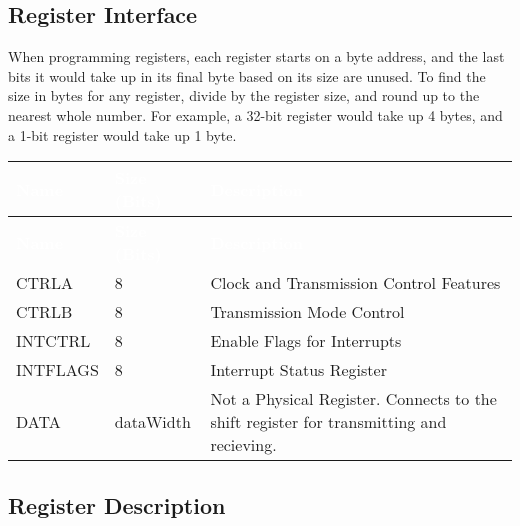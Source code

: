 \subsection{Register Interface}
 
When programming registers, each register starts on a byte address, and the last bits it would take up in its final byte based on its size are unused. To find the size in bytes for any register, divide by the register size, and round up to the nearest whole number. For example, a 32-bit register would take up 4 bytes, and a 1-bit register would take up 1 byte.
\renewcommand*{\arraystretch}{1.4}
\begingroup
\small
{} %
\begin{longtable}[H]{
  | p{}
  | p{}
  | p{} |
  }
  \hline
  \rowcolor{dark-gray}

  \textcolor{white}{\textbf{Name}} &   
  \textcolor{white}{\textbf{Size (Bits)}} &   
  \textcolor{white}{\textbf{Description}} \\ \hline \hline
  \endfirsthead

  \textcolor{white}{\textbf{Name}} &   
  \textcolor{white}{\textbf{Size (Bits)}} &   
  \textcolor{white}{\textbf{Description}} \\ \hline \hline
  \endhead

  
  CTRLA  &   
  8 &   
  Clock and Transmission Control Features \\ \hline

  CTRLB &   
  8 &   
  Transmission Mode Control \\ \hline

  INTCTRL &   
  8 &   
  Enable Flags for Interrupts \\ \hline

  INTFLAGS &   
  8 &   
  Interrupt Status Register \\ \hline

  DATA&   
  dataWidth &   
  Not a Physical Register. Connects to the shift register for transmitting and recieving. \\ \hline

\end{longtable}
\captionsetup{aboveskip=0pt}
\label{table:register}

  \newpage

  \subsection{Register Description}


